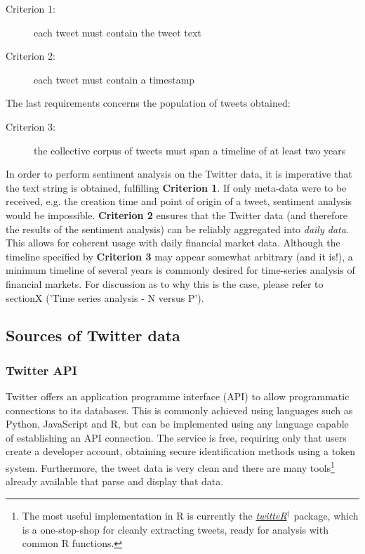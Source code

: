 \documentclass{article}
\begin{document}
\begin{description}
\item[{Criterion 1:}] each tweet must contain the tweet text

\item[{Criterion 2:}] each tweet must contain a timestamp
\end{description}

\noindent
The last requirements concerns the population of tweets obtained:

\begin{description}
\item[{Criterion 3:}] the collective corpus of tweets must span a timeline of at least two years
\end{description}

\noindent
In order to perform sentiment analysis on the Twitter data, it is imperative that the text string is obtained, fulfilling \textbf{Criterion 1}. If only meta-data were to be received, e.g. the creation time and point of origin of a tweet, sentiment analysis would be impossible. \textbf{Criterion 2} ensures that the Twitter data (and therefore the results of the sentiment analysis) can be reliably aggregated into \emph{daily data}. This allows for coherent usage with daily financial market data. Although the timeline specified by \textbf{Criterion 3} may appear somewhat arbitrary (and it is!), a minimum timeline of several years is commonly desired for time-series analysis of financial markets. For discussion as to why this is the case, please refer to sectionX ('Time series analysis - N versus P').


\subsection{Sources of Twitter data}
\label{sec-2-3}


\subsubsection{Twitter API}
\label{sec-2-3-1}
Twitter offers an application programme interface (API) to allow programmatic connections to its databases. This is commonly achieved using languages such as Python, JavaScript and R, but can be implemented using any language capable of establishing an API connection.
The service is free, requiring only that users create a developer account, obtaining secure identification methods using a token system. Furthermore, the tweet data is very clean and there are many tools\footnote{The most useful implementation in R is currently the \href{https://cran.r-project.org/web/packages/twitteR/index.html}{\emph{twitteR$^{\dag{}}$}} package, which is a one-stop-shop for cleanly extracting tweets, ready for analysis with common R functions.} already available that parse and display that data.
\end{document}
